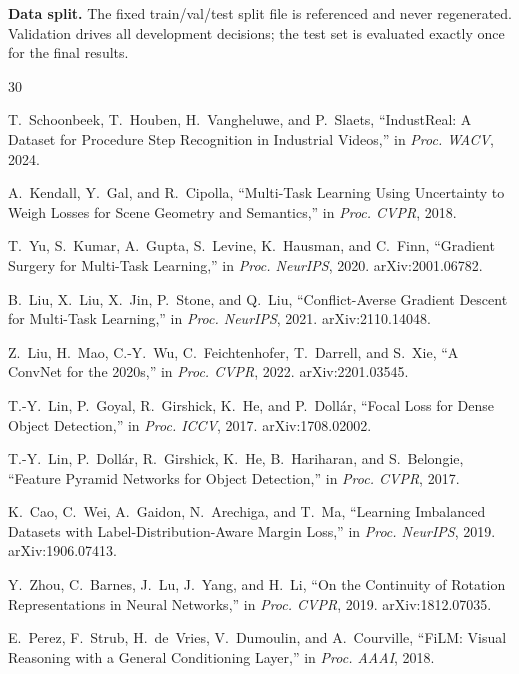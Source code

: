 \documentclass[conference]{IEEEtran}
\begin{document}
\textbf{Data split.} The fixed train/val/test split file is referenced and never regenerated. Validation drives all development decisions; the test set is evaluated exactly once for the final results.

\balance
\begin{thebibliography}{30}

T.~Schoonbeek, T.~Houben, H.~Vangheluwe, and P.~Slaets,
``IndustReal: A Dataset for Procedure Step Recognition in Industrial Videos,''
in \emph{Proc. WACV}, 2024.

A.~Kendall, Y.~Gal, and R.~Cipolla,
``Multi-Task Learning Using Uncertainty to Weigh Losses for Scene Geometry and Semantics,''
in \emph{Proc. CVPR}, 2018.

T.~Yu, S.~Kumar, A.~Gupta, S.~Levine, K.~Hausman, and C.~Finn,
``Gradient Surgery for Multi-Task Learning,''
in \emph{Proc. NeurIPS}, 2020.
arXiv:2001.06782.

B.~Liu, X.~Liu, X.~Jin, P.~Stone, and Q.~Liu,
``Conflict-Averse Gradient Descent for Multi-Task Learning,''
in \emph{Proc. NeurIPS}, 2021.
arXiv:2110.14048.

Z.~Liu, H.~Mao, C.-Y.~Wu, C.~Feichtenhofer, T.~Darrell, and S.~Xie,
``A ConvNet for the 2020s,''
in \emph{Proc. CVPR}, 2022.
arXiv:2201.03545.

T.-Y.~Lin, P.~Goyal, R.~Girshick, K.~He, and P.~Doll\'{a}r,
``Focal Loss for Dense Object Detection,''
in \emph{Proc. ICCV}, 2017.
arXiv:1708.02002.

T.-Y.~Lin, P.~Doll\'{a}r, R.~Girshick, K.~He, B.~Hariharan, and S.~Belongie,
``Feature Pyramid Networks for Object Detection,''
in \emph{Proc. CVPR}, 2017.

K.~Cao, C.~Wei, A.~Gaidon, N.~Arechiga, and T.~Ma,
``Learning Imbalanced Datasets with Label-Distribution-Aware Margin Loss,''
in \emph{Proc. NeurIPS}, 2019.
arXiv:1906.07413.

Y.~Zhou, C.~Barnes, J.~Lu, J.~Yang, and H.~Li,
``On the Continuity of Rotation Representations in Neural Networks,''
in \emph{Proc. CVPR}, 2019.
arXiv:1812.07035.

E.~Perez, F.~Strub, H.~de~Vries, V.~Dumoulin, and A.~Courville,
``FiLM: Visual Reasoning with a General Conditioning Layer,''
in \emph{Proc. AAAI}, 2018.


\end{thebibliography}
\end{document}
